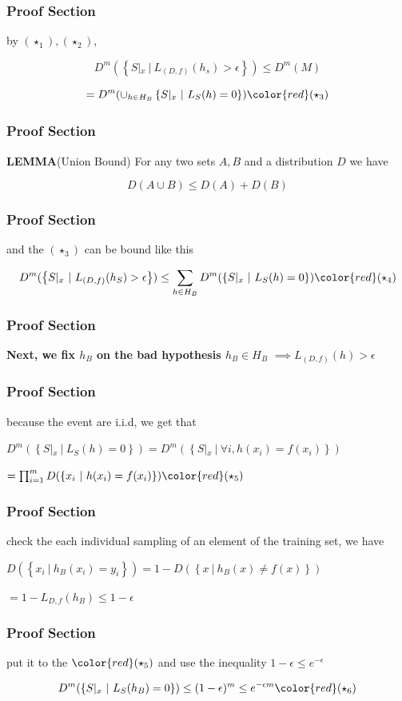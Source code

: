 \documentclass[xcolor=dvipsnames]{beamer}
\theoremstyle{plain}
\newcommand{\sett}[1]{\left\{#1 \right\}}
\begin{document}
\begin{frame}
	\frametitle{Proof Section}
	by $(\star_1),(\star_2)$,

$$D^m(\sett{S|_x~|~L_{(D,f)}(h_s)>\epsilon}) \leq D^m(M) $$

$$= D^m(\cup_{h\in H_B}\sett{S|_x ~|~ L_S(h) = 0})\color{red}(\star_3)$$
	
\end{frame}


\begin{frame}
	\frametitle{Proof Section}
	\textbf{LEMMA}(Union Bound) For any two sets $A,B$ and a distribution $D$ we have

$$D(A\cup B) \leq D(A) + D(B)$$
	
\end{frame}


\begin{frame}
	\frametitle{Proof Section}
	and the $(\star_3)$ can be bound like this

$$D^m(\sett{S|_x ~|~ L_{(D,f)}(h_S)>\epsilon}) \leq \sum_{h \in H_B}D^m(\sett{S|_x ~|~ L_S(h) = 0})\color{red}(\star_4)$$
	
\end{frame}


\begin{frame}
	\frametitle{Proof Section}
	\textbf{Next, we fix $h_B$ on the bad hypothesis $h_B \in H_B$} $\implies L_{(D,f)}(h) > \epsilon$
	
\end{frame}


\begin{frame}
	\frametitle{Proof Section}
	because the event are i.i.d, we get that

$D^m(\sett{S|_x~|~L_S(h)=0}) = D^m(\sett{S|_x ~|~\forall i,h(x_i) = f(x_i)})$

$ = \prod^m_{i=1}D(\sett{x_i~|~h(x_i) = f(x_i)})\color{red}(\star_5)$
	
\end{frame}


\begin{frame}
	\frametitle{Proof Section}
	check the each individual sampling of an element of the training set, we have

$D(\sett{x_i~|~h_B(x_i) = y_i}) = 1-D(\sett{x ~|~ h_B(x) \neq f(x)})$

$=1 - L_{D,f}(h_B) \leq 1 - \epsilon$
	
\end{frame}

\begin{frame}
	\frametitle{Proof Section}
	put it to the $\color{red}(\star_5)$ and use the inequality $1 - \epsilon \leq e^{-\epsilon}$

$$D^m(\sett{S|_x~|~ L_S(h_B) = 0}) \leq (1 -\epsilon)^m \leq e^{-\epsilon m}\color{red}(\star_6)$$
	
\end{frame}
\end{document}
